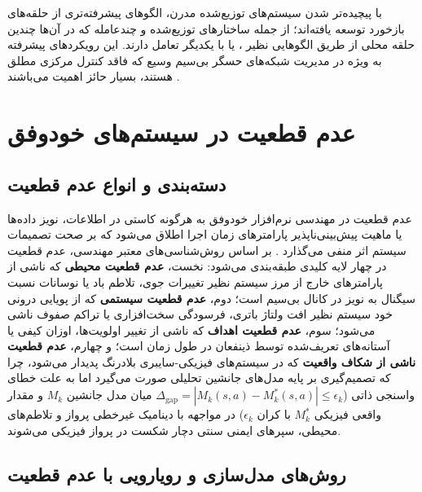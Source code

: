 \documentclass[oneside,openany,phd]{TMU-Thesis}
\begin{document}
با پیچیده‌تر شدن سیستم‌های توزیع‌شده مدرن، الگوهای پیشرفته‌تری از حلقه‌های بازخورد توسعه یافته‌اند؛ از جمله ساختارهای توزیع‌شده و چندعامله \cite{weyns2018applying, delemos2017software} که در آن‌ها چندین حلقه محلی از طریق الگوهایی نظیر ،  یا  با یکدیگر تعامل دارند. این رویکردهای پیشرفته به ویژه در مدیریت شبکه‌های حسگر بی‌سیم وسیع که فاقد کنترل مرکزی مطلق هستند، بسیار حائز اهمیت می‌باشند \cite{weyns2018applying, delemos2017software}.

\section{عدم قطعیت در سیستم‌های خودوفق}

\subsection{دسته‌بندی و انواع عدم قطعیت}

عدم قطعیت در مهندسی نرم‌افزار خودوفق به هرگونه کاستی در اطلاعات، نویز داده‌ها یا ماهیت پیش‌بینی‌ناپذیر پارامترهای زمان اجرا اطلاق می‌شود که بر صحت تصمیمات سیستم اثر منفی می‌گذارد \cite{cheng2009software}. بر اساس روش‌شناسی‌های معتبر مهندسی، عدم قطعیت در چهار لایه کلیدی طبقه‌بندی می‌شود: نخست، \textbf{عدم قطعیت محیطی} که ناشی از پارامترهای خارج از مرز سیستم نظیر تغییرات جوی، تلاطم باد یا نوسانات نسبت سیگنال به نویز در کانال بی‌سیم است؛ دوم، \textbf{عدم قطعیت سیستمی} که از پویایی درونی خود سیستم نظیر افت ولتاژ باتری، فرسودگی سخت‌افزاری یا تراکم صفوف ناشی می‌شود؛ سوم، \textbf{عدم قطعیت اهداف} که ناشی از تغییر اولویت‌ها، اوزان کیفی یا آستانه‌های تعریف‌شده توسط ذینفعان در طول زمان است؛ و چهارم، \textbf{عدم قطعیت ناشی از شکاف واقعیت} که در سیستم‌های فیزیکی-سایبری بلادرنگ پدیدار می‌شود، چرا که تصمیم‌گیری بر پایه مدل‌های جانشین تحلیلی صورت می‌گیرد اما به علت خطای واسنجی ذاتی ($\Delta_{\text{gap}} = |M_k(s, a) - M_k^*(s, a)| \le \epsilon_k$ میان مدل جانشین $M_k$ و مقدار واقعی فیزیکی $M_k^*$ با کران $\epsilon_k$) در مواجهه با دینامیک غیرخطی پرواز و تلاطم‌های محیطی، سپرهای ایمنی سنتی دچار شکست در پرواز فیزیکی می‌شوند.

\subsection{روش‌های مدل‌سازی و رویارویی با عدم قطعیت}
\end{document}
